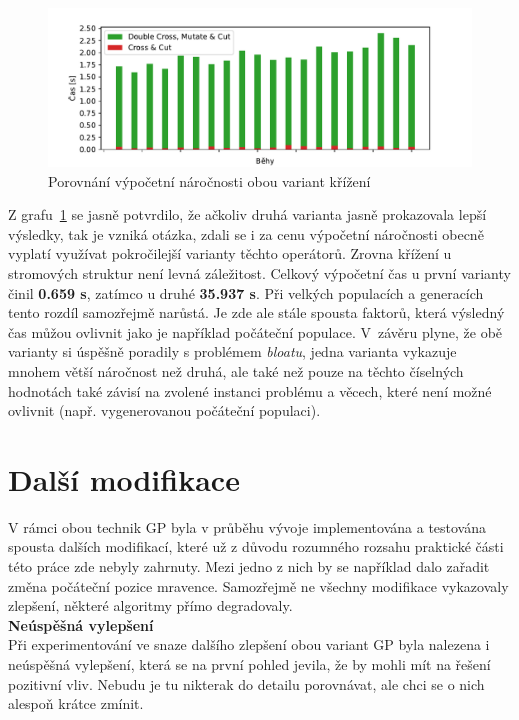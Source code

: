 \begin{figure}[!h]
    \centering
    \includegraphics[scale=0.7]{obrazky-figures/exp-tgp-cross-comp-time.pdf}
    \caption{Porovnání výpočetní náročnosti obou variant křížení}
    \label{fig:exp-tgp-cross-comp-time}
\end{figure}  

Z grafu~\ref{fig:exp-tgp-cross-comp-time} se jasně potvrdilo, že ačkoliv druhá varianta jasně prokazovala lepší výsledky, tak je vzniká otázka, zdali se i za cenu výpočetní náročnosti obecně vyplatí využívat pokročilejší varianty těchto operátorů. Zrovna křížení u stromových struktur není levná záležitost. Celkový výpočetní čas u první varianty činil \textbf{0.659 s}, zatímco u druhé \textbf{35.937 s}. Při velkých populacích a generacích tento rozdíl samozřejmě narůstá. Je zde ale stále spousta faktorů, která výsledný čas můžou ovlivnit jako je například počáteční populace. V~závěru plyne, že obě varianty si úspěšně poradily s problémem \emph{bloatu}, jedna varianta vykazuje mnohem větší náročnost než druhá, ale také než pouze na těchto číselných hodnotách také závisí na zvolené instanci problému a věcech, které není možné ovlivnit (např. vygenerovanou počáteční populaci).


\section{Další modifikace }
V rámci obou technik GP byla v průběhu vývoje implementována a testována spousta dalších modifikací, které už z důvodu rozumného rozsahu praktické části této práce zde nebyly zahrnuty. Mezi jedno z nich by se například dalo zařadit změna počáteční pozice mravence. Samozřejmě ne všechny modifikace vykazovaly zlepšení, některé algoritmy přímo degradovaly. \\

\noindent\textbf{Neúspěšná vylepšení} \\
Při experimentování ve snaze dalšího zlepšení obou variant GP byla nalezena i neúspěšná vylepšení, která se na první pohled jevila, že by mohli mít na řešení pozitivní vliv. Nebudu je tu nikterak do detailu porovnávat, ale chci se o nich alespoň krátce zmínit.

